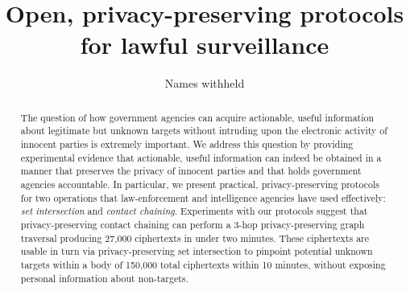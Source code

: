 \documentclass[USenglish,oneside,twocolumn]{article}
\begin{document}
 

  \author[1]{Names withheld}






  \title{\huge Open, privacy-preserving protocols for lawful surveillance}



  \begin{abstract}
{The question of how government agencies can
acquire actionable, useful information about legitimate but unknown targets 
without intruding upon the electronic activity of innocent parties is 
extremely important.  We address this question by providing experimental
evidence that actionable, useful information can indeed be obtained in a manner
that preserves the privacy of innocent parties and that holds government
agencies accountable.  In particular, we present practical, privacy-preserving
protocols for two operations that law-enforcement and intelligence agencies
have used effectively: {\it set intersection} and {\it contact chaining}.
Experiments with our protocols suggest
that privacy-preserving contact chaining can perform
a 3-hop privacy-preserving graph traversal producing 27,000 ciphertexts
in under two minutes.
These ciphertexts are usable in turn via privacy-preserving set
intersection to pinpoint potential unknown targets within a body of 150,000
total ciphertexts within 10 minutes,
without exposing personal information about non-targets.
}
  \end{abstract}



\maketitle
\end{document}
